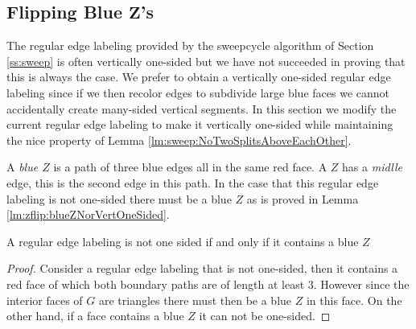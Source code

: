 
\subsection{Flipping Blue $\mathbf{Z}$'s}
\thispagestyle{plain}
\label{ss:flipBlueZ}

  The regular edge labeling provided by the sweepcycle algorithm of Section \ref{ss:sweep} is often vertically one-sided but we have not succeeded in proving that this is always the case.
  We prefer to obtain a vertically one-sided regular edge labeling since if we then recolor edges to subdivide large blue faces we cannot accidentally create many-sided vertical segments.
  In this section we modify the current regular edge labeling to make it vertically one-sided while maintaining the nice property of Lemma \ref{lm:sweep:NoTwoSplitsAboveEachOther}.


  A \emph{blue $Z$} is a path of three blue edges all in the same red face. A $Z$ has a \emph{midlle} edge, this is the second edge in this path.
  In the case that this regular edge labeling is not one-sided there must be a blue $Z$ as is proved in Lemma \ref{lm:zflip:blueZNorVertOneSided}.
  \begin{lemma}
    \label{lm:zflip:blueZNorVertOneSided}
    A regular edge labeling is not one sided if and only if it contains a blue $Z$
  \end{lemma}
  \begin{proof}
    Consider a regular edge labeling that is not one-sided, then it contains a red face of which both boundary paths are of length at least $3$. However since the interior faces of $G$ are triangles there must then be a blue $Z$ in this face.
    On the other hand, if a face contains a blue $Z$ it can not be one-sided.
  \end{proof}

